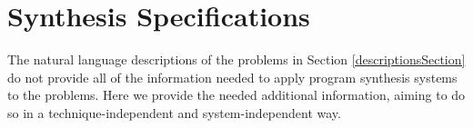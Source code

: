 \documentclass{sig-alternate}
\begin{document}
\section{Synthesis Specifications} \label{synthProbSpec}



The natural language descriptions of the problems in Section \ref{descriptionsSection} do not provide all of the information needed to apply program synthesis systems to the problems. Here we provide the needed additional information, aiming to do so in a technique-independent and system-independent way.
\end{document}
